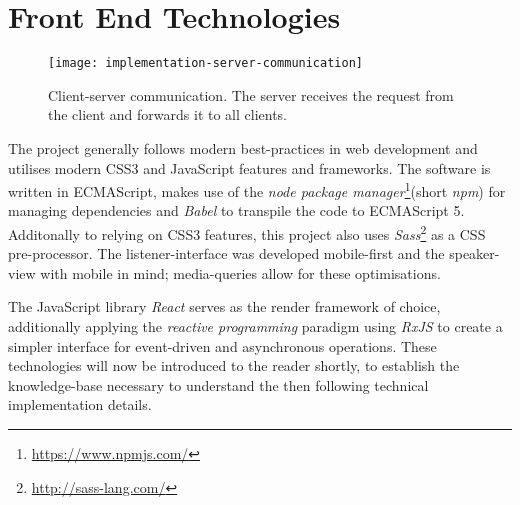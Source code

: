 \section{Front End Technologies}
\label{sec:implementation-technologies}

\begin{figure}
\centering
\texttt{[image: implementation-server-communication]}
\caption{Client-server communication. The server receives the request from the client and forwards it to all clients.}
\label{fig:implementation-client-server-communication}
\end{figure}

The project generally follows modern best-practices in web development and utilises modern CSS3 and JavaScript features and frameworks. The software is written in ECMA\-Script, makes use of the \emph{node package manager}\footnote{\url{https://www.npmjs.com/}}(short \emph{npm}) for managing dependencies and \emph{Babel} to transpile the code to ECMA\-Script 5. Additonally to relying on CSS3 features, this project also uses \emph{Sass}\footnote{\url{http://sass-lang.com/}} as a CSS pre-processor. The listener-interface was developed mobile-first and the speaker-view with mobile in mind; media-queries allow for these optimisations.

The JavaScript library \emph{React} serves as the render framework of choice, additionally applying the \emph{reactive programming} paradigm using \emph{RxJS} to create a simpler interface for event-driven and asynchronous operations. These technologies will now be introduced to the reader shortly, to establish the knowledge-base necessary to understand the then following technical implementation details.


